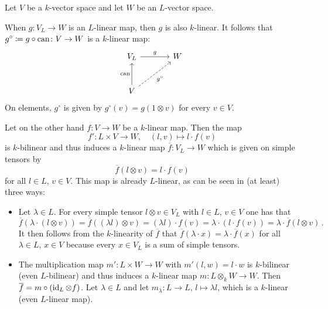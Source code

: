 \begin{fluff}
  Let $V$ be a $k$-vector space and let $W$ be an $L$-vector space.
  
  When $g \colon V_L \to W$ is an $L$-linear map, then $g$ is also $k$-linear.
  It follows that $g^\circ \coloneqq g \circ \operatorname{can} \colon V \to W$ is a $k$-linear map:
  \[
    \begin{tikzcd}[sep = large]
        V_L
        \arrow{r}[above]{g}
      & W
      \\
        V
        \arrow{u}[left]{\can}
        \arrow[dashed]{ru}[below right]{g^\circ}
      & {}
    \end{tikzcd}
  \]
  On elements, $g^\circ$ is given by $g^\circ(v) = g(1 \otimes v)$ for every $v \in V$.
  
  Let on the other hand $f \colon V \to W$ be a $k$-linear map.
  Then the map
  \[
            f'
    \colon  L \times V
    \to     W,
    \quad   (l,v)
    \mapsto l \cdot f(v)
  \]
  is $k$-bilinear and thus induces a $k$-linear map $\overline{f} \colon V_L \to W$ which is given on simple tensors by
  \[
      \overline{f}(l \otimes v)
    = l \cdot f(v)
  \]
  for all $l \in L$, $v \in V$.
  This map is already $L$-linear, as can be seen in (at least) three ways:
  \begin{itemize}
    \item
      Let $\lambda \in L$.
      For every simple tensor $l \otimes v \in V_L$ with $l \in L$, $v \in V$ one has that
      \[
          \overline{f}(\lambda \cdot (l \otimes v))
        = \overline{f}( (\lambda l) \otimes v )
        = (\lambda l) \cdot f(v)
        = \lambda \cdot (l \cdot f(v))
        = \lambda \cdot \overline{f}(l \otimes v) \,.
      \]
      It then follows from the $k$-linearity of $\overline{f}$ that $\overline{f}(\lambda \cdot x) = \lambda \cdot \overline{f}(x)$ for all $\lambda \in L$, $x \in V$ because every $x \in V_L$ is a sum of simple tensors.
    \item
      The multiplication map $m' \colon L \times W \to W$ with $m'(l,w) = l \cdot w$ is $k$-bilinear (even $L$-bilinear) and thus induces a $k$-linear map $m \colon L \otimes_k W \to W$.
      Then $\overline{f} = m \circ (\operatorname{id}_L \otimes f)$.
      Let $\lambda \in L$ and let $m_\lambda \colon L \to L$, $l \mapsto \lambda l$, which is a $k$-linear (even $L$-linear map).

\end{itemize}
\end{fluff}
